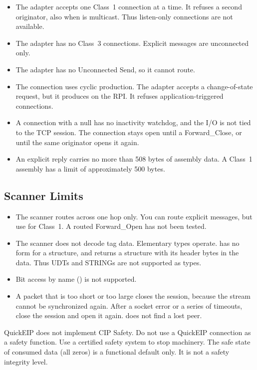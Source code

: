 \begin{itemize}
  \item The adapter accepts one Class~1 connection at a time. It refuses a
        second originator, also when \TO{} is multicast. Thus listen-only
        connections are not available.
  \item The adapter has no Class~3 connections. Explicit messages are
        unconnected only.
  \item The adapter has no Unconnected Send, so it cannot route.
  \item The \TO{} connection uses cyclic production. The adapter accepts a
        change-of-state request, but it produces on the RPI. It refuses
        application-triggered connections.
  \item A connection with a null \OT{} has no inactivity watchdog, and the
        I/O is not tied to the TCP session. The connection stays open until a
        Forward\_Close, or until the same originator opens it again.
  \item An explicit reply carries no more than 508 bytes of assembly data. A
        Class~1 assembly has a limit of approximately 500 bytes.
\end{itemize}

\subsection{Scanner Limits}

\begin{itemize}
  \item The scanner routes across one hop only. You can route explicit
        messages, but use  for Class~1. A routed Forward\_Open
        has not been tested.
  \item The scanner does not decode tag data. Elementary types operate.
         has no form for a structure, and
         returns a structure with its header bytes in the
        data. Thus UDTs and STRINGs are not supported as types.
  \item Bit access by name () is not supported.
  \item A packet that is too short or too large closes the session, because
        the stream cannot be synchronized again. After a socket error or a
        series of timeouts, close the session and open it again.
         does not find a lost peer.
\end{itemize}

\begin{warning}
QuickEIP does not implement CIP Safety. Do not use a QuickEIP connection as
a safety function. Use a certified safety system to stop machinery. The
safe state of consumed data (all zeros) is a functional default only. It is
not a safety integrity level.
\end{warning}

